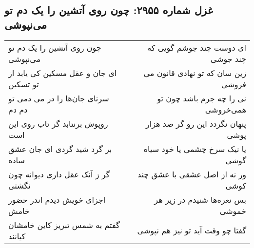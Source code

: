 \begin{center}
\section*{غزل شماره ۲۹۵۵: چون روی آتشین را یک دم تو می‌نپوشی}
\label{sec:2955}
\begin{longtable}{l p{0.5cm} r}
چون روی آتشین را یک دم تو می‌نپوشی
&&
ای دوست چند جوشم گویی که چند جوشی
\\
ای جان و عقل مسکین کی یابد از تو تسکین
&&
زین سان که تو نهادی قانون می فروشی
\\
سرنای جان‌ها را در می دمی تو دم دم
&&
نی را چه جرم باشد چون تو همی‌خروشی
\\
روپوش برنتابد گر تاب روی این است
&&
پنهان نگردد این رو گر صد هزار پوشی
\\
بر گرد شید گردی ای جان عشق ساده
&&
یا نیک سرخ چشمی یا خود سیاه گوشی
\\
گر ز آنک عقل داری دیوانه چون نگشتی
&&
ور نه از اصل عشقی با عشق چند کوشی
\\
اجزای خویش دیدم اندر حضور خامش
&&
بس نعره‌ها شنیدم در زیر هر خموشی
\\
گفتم به شمس تبریز کاین خامشان کیانند
&&
گفتا چو وقت آید تو نیز هم نپوشی
\\
\end{longtable}
\end{center}
